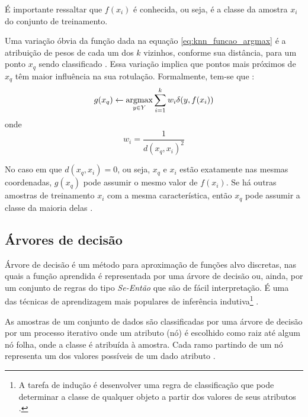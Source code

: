É importante ressaltar que $f(x_i)$ é conhecida, ou seja, é a classe da amostra $x_i$ do conjunto de treinamento.

Uma variação óbvia da função dada na equação \ref{eq:knn_funcao_argmax} é a atribuição de pesos de cada um dos $k$ vizinhos, conforme sua distância, para um ponto $x_q$ sendo classificado \citep{mitchell:97}. Essa variação implica que pontos mais próximos de $x_q$ têm maior influência na sua rotulação. Formalmente, tem-se que \citep{mitchell:97}:
\begin{equation}
\label{eq:knn_funcao_argmax_pesos}
g(x_q) \gets \operatorname*{argmax}_{y \in Y} \sum_{i=1}^k w_i \delta (y, f(x_i))
\end{equation}
\noindent onde
\begin{equation}
\label{eq:knn_funcao_peso}
  w_i = \frac{1}{d(x_q, x_i)^2}
\end{equation}

No caso em que $d(x_q, x_i) = 0$, ou seja, $x_q$ e $x_i$ estão exatamente nas mesmas coordenadas, $g(x_q)$ pode assumir o mesmo valor de $f(x_i)$. Se há outras amostras de treinamento $x_i$ com a mesma característica, então $x_q$ pode assumir a classe da maioria delas \citep{mitchell:97}.


\subsection{Árvores de decisão}
\label{sec:clasificadores_arvores_decisao}
Árvore de decisão é um método para aproximação de funções alvo discretas, nas quais a função aprendida é representada por uma árvore de decisão ou, ainda, por um conjunto de regras do tipo \emph{Se-Então} que são de fácil interpretação. É uma das técnicas de aprendizagem mais populares de inferência indutiva\footnote{A tarefa de indução é desenvolver uma regra de classificação que pode determinar a classe de qualquer objeto a partir dos valores de seus atributos \citep{quinlan:86}.} \citep{mitchell:97}.

As amostras de um conjunto de dados são classificadas por uma árvore de decisão por um processo iterativo onde um atributo (nó) é escolhido como raiz até algum nó folha, onde a classe é atribuída à amostra. Cada ramo partindo de um nó representa um dos valores possíveis de um dado atributo \citep{mitchell:97}.

